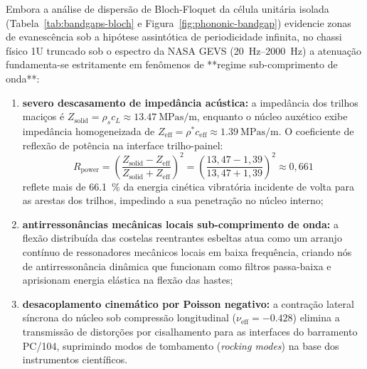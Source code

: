 Embora a análise de dispersão de Bloch-Floquet da célula unitária isolada (Tabela~\ref{tab:bandgaps-bloch} e Figura~\ref{fig:phononic-bandgap}) evidencie zonas de evanescência sob a hipótese assintótica de periodicidade infinita, no chassi físico 1U truncado sob o espectro da NASA GEVS (\SIrange{20}{2000}{\hertz}) a atenuação fundamenta-se estritamente em fenômenos de **regime sub-comprimento de onda**:
\begin{enumerate}
  \item \textbf{severo descasamento de impedância acústica:} a impedância dos trilhos maciços é $Z_{\text{solid}} = \rho_s c_L \approx \SI{13.47}{\mega\pascal\second\per\metre}$, enquanto o núcleo auxético exibe impedância homogeneizada de $Z_{\text{eff}} = \rho^* c_{\text{eff}} \approx \SI{1.39}{\mega\pascal\second\per\metre}$. O coeficiente de reflexão de potência na interface trilho-painel:
  \begin{equation}
    R_{\text{power}} = \left( \frac{Z_{\text{solid}} - Z_{\text{eff}}}{Z_{\text{solid}} + Z_{\text{eff}}} \right)^2 = \left( \frac{13{,}47 - 1{,}39}{13{,}47 + 1{,}39} \right)^2 \approx 0{,}661
  \end{equation}
  reflete mais de \SI{66.1}{\percent} da energia cinética vibratória incidente de volta para as arestas dos trilhos, impedindo a sua penetração no núcleo interno;
  \item \textbf{antirressonâncias mecânicas locais sub-comprimento de onda:} a flexão distribuída das costelas reentrantes esbeltas atua como um arranjo contínuo de ressonadores mecânicos locais em baixa frequência, criando nós de antirressonância dinâmica que funcionam como filtros passa-baixa e aprisionam energia elástica na flexão das hastes;
  \item \textbf{desacoplamento cinemático por Poisson negativo:} a contração lateral síncrona do núcleo sob compressão longitudinal ($\nu_{\text{eff}} = \num{-0.428}$) elimina a transmissão de distorções por cisalhamento para as interfaces do barramento PC/104, suprimindo modos de tombamento (\textit{rocking modes}) na base dos instrumentos científicos.
\end{enumerate}

